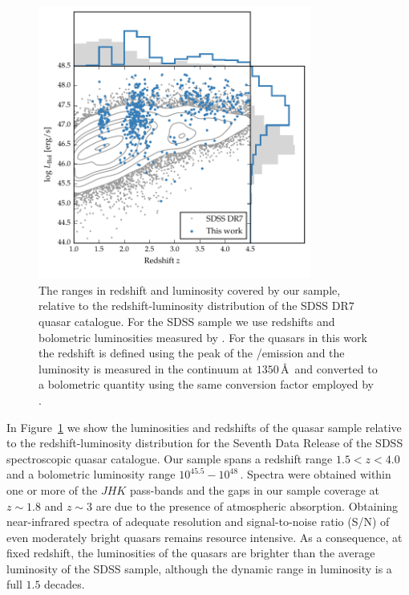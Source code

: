 \begin{figure}[h!]
    \centering
    \includegraphics[width=0.8\textwidth]{figures/chapter02/luminosity_z.pdf} 
    \caption[{The ranges in redshift and luminosity covered by our sample, relative to the redshift-luminosity distribution of the SDSS DR$7$ quasar catalogue.}]{The ranges in redshift and luminosity covered by our sample, relative to the redshift-luminosity distribution of the SDSS DR$7$ quasar catalogue. For the SDSS sample we use \citet{hewett10} redshifts and bolometric luminosities measured by \citet{shen11}. For the quasars in this work the redshift is defined using the peak of the \hans/\hb emission and the luminosity is measured in the continuum at $1350$\,\AA\, and converted to a bolometric quantity using the same conversion factor employed by \citet{shen11}.}     
    \label{fig:lzplane}
\end{figure}

In Figure~\ref{fig:lzplane} we show the luminosities and redshifts of the quasar sample relative to the redshift-luminosity distribution for the Seventh Data Release \citep[DR$7$;][]{schneider10} of the SDSS spectroscopic quasar catalogue.
Our sample spans a redshift range $1.5 < z < 4.0$ and a bolometric luminosity range $10^{45.5}-10^{48}$\,\ergs. 
Spectra were obtained within one or more of the $JHK$ pass-bands and the gaps in our sample coverage at $z\sim1.8$ and $z\sim3$ are due to the presence of atmospheric absorption. 
Obtaining near-infrared spectra of adequate resolution and signal-to-noise ratio (S/N) of even moderately bright quasars remains resource intensive. 
As a consequence, at fixed redshift, the luminosities of the quasars are brighter than the average luminosity of the SDSS sample, although the dynamic range in luminosity is a full $1.5$ decades.

